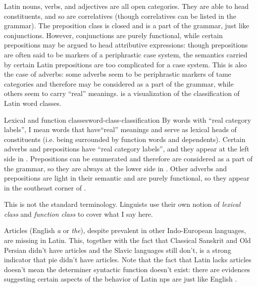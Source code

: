 \documentclass[a4paper, oneside, 12pt]{report}
\newcommand*{\term}[1]{\emph{#1}}
\newcommand{\form}[1]{\emph{#1}}
\begin{document}
Latin nouns, verbs, and adjectives are all open categories.
They are able to head constituents,
and so are correlatives (though correlatives can be listed in the grammar).
The preposition class is closed and is a part of the grammar,
just like conjunctions.
However, conjunctions are purely functional,
while certain prepositions may be argued to head attributive expressions:
though prepositions are often said to be markers of a periphrastic case system,
the semantics carried by certain Latin prepositions are too complicated for a case system.
This is also the case of adverbs:
some adverbs seem to be periphrastic markers of \acs{tame} categories
and therefore may be considered as a part of the grammar,
while others seem to carry ``real'' meanings.
 is a visualization of the classification of Latin word classes.

\begin{theorybox}{Lexical and function classes}{word-class-classification}
    By words with ``real category labels'',
    I mean words that have``real'' meanings
    and serve as lexical heads of constituents
    (i.e. being surrounded by function words and dependents).
    Certain adverbs and prepositions have ``real category labels'',
    and they appear at the left side in .
    Prepositions can be enumerated and therefore are considered as a part of the grammar,
    so they are always at the lower side in .
    Other adverbs and prepositions are light in their semantic
    and are purely functional,
    so they appear in the southeast corner of .

    This is not the standard terminology. 
    Linguists use their own notion of \term{lexical class} and \term{function class}
    to cover what I say here. 
\end{theorybox}

\begin{sidewaysfigure}
    \centering
    
    \caption{Latin word classes}
    \label{fig:latin-word-class}
\end{sidewaysfigure}

Articles (English \form{a} or \form{the}), 
despite prevalent in other Indo-European languages,
are missing in Latin.
This, together with the fact that Classical Sanskrit and Old Persian didn't have articles 
and the Slavic languages still don't,
is a strong indicator that \ac{pie} didn't have articles. 
Note that the fact that Latin lacks articles 
doesn't mean the determiner syntactic function doesn't exist:
there are evidences suggesting certain aspects of the behavior of Latin \acs{np}s 
are just like English \citep{giusti2014split}.
\end{document}
